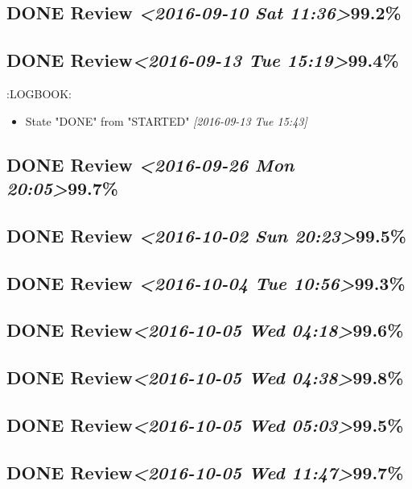 \documentclass[11pt]{ctexart}
\begin{document}
\subsection{{\bfseries\sffamily DONE} Review \textit{<2016-09-10 Sat 11:36>}99.2\%}
\label{sec:org208aaeb}
\subsection{{\bfseries\sffamily DONE} Review\textit{<2016-09-13 Tue 15:19>}99.4\%}
\label{sec:orgd3b93c6}
:LOGBOOK:
\begin{itemize}
\item State "DONE"       from "STARTED"    \textit{[2016-09-13 Tue 15:43]}
\end{itemize}
\subsection{{\bfseries\sffamily DONE} Review \textit{<2016-09-26 Mon 20:05>}99.7\%}
\label{sec:org2dc2670}
\subsection{{\bfseries\sffamily DONE} Review \textit{<2016-10-02 Sun 20:23>}99.5\%}
\label{sec:org0b4c7a1}
\subsection{{\bfseries\sffamily DONE} Review \textit{<2016-10-04 Tue 10:56>}99.3\%}
\label{sec:org9abe982}
\subsection{{\bfseries\sffamily DONE} Review\textit{<2016-10-05 Wed 04:18>}99.6\%}
\label{sec:org6bdbccf}
\subsection{{\bfseries\sffamily DONE} Review\textit{<2016-10-05 Wed 04:38>}99.8\%}
\label{sec:orgf815588}
\subsection{{\bfseries\sffamily DONE} Review\textit{<2016-10-05 Wed 05:03>}99.5\%}
\label{sec:orge992c02}
\subsection{{\bfseries\sffamily DONE} Review\textit{<2016-10-05 Wed 11:47>}99.7\%}
\label{sec:org3ba95b5}
\end{document}
